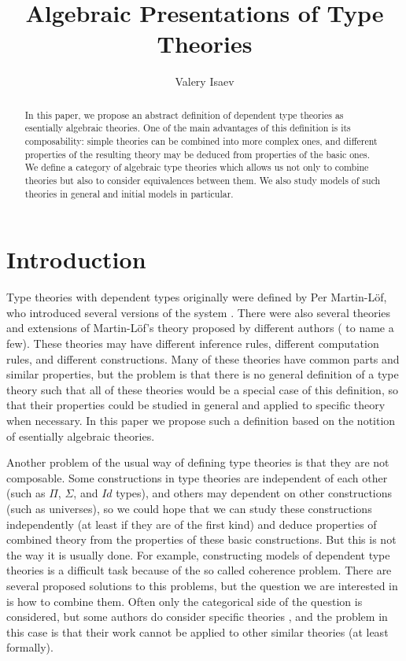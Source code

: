 \documentclass{amsart}
\theoremstyle{definition}
\theoremstyle{remark}
\numberwithin{figure}{section}
\begin{document}
\title{Algebraic Presentations of Type Theories}

\author{Valery Isaev}

\begin{abstract}
In this paper, we propose an abstract definition of dependent type theories as esentially algebraic theories.
One of the main advantages of this definition is its composability: simple theories can be combined into more complex ones,
and different properties of the resulting theory may be deduced from properties of the basic ones.
We define a category of algebraic type theories which allows us not only to combine theories but also to consider equivalences between them.
We also study models of such theories in general and initial models in particular.
\end{abstract}

\maketitle

\section{Introduction}

Type theories with dependent types originally were defined by Per Martin-L\"{o}f, who introduced several versions of the system \cite{MLTT72,MLTT73,MLTT79}.
There were also several theories and extensions of Martin-L\"{o}f's theory proposed by different authors (\cite{CoC,luo94} to name a few).
These theories may have different inference rules, different computation rules, and different constructions.
Many of these theories have common parts and similar properties,
but the problem is that there is no general definition of a type theory such that all of these theories would be a special case of this definition,
so that their properties could be studied in general and applied to specific theory when necessary.
In this paper we propose such a definition based on the notition of esentially algebraic theories.

Another problem of the usual way of defining type theories is that they are not composable.
Some constructions in type theories are independent of each other (such as $\Pi$, $\Sigma$, and $Id$ types),
and others may dependent on other constructions (such as universes),
so we could hope that we can study these constructions independently (at least if they are of the first kind)
and deduce properties of combined theory from the properties of these basic constructions.
But this is not the way it is usually done.
For example, constructing models of dependent type theories is a difficult task because of the so called coherence problem.
There are several proposed solutions to this problems, but the question we are interested in is how to combine them.
Often only the categorical side of the question is considered,
but some authors do consider specific theories \cite{streicher,pitts},
and the problem in this case is that their work cannot be applied to other similar theories (at least formally).
\end{document}
